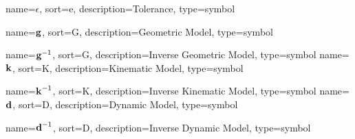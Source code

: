 	{%
		name={\ensuremath{\epsilon}},
		sort=e,
		description=Tolerance,
		type=symbol
	}
	\newcommand{\tol}{\gls{sym:tolerance}}

	{%
		name={\ensuremath{\vecfunc{g}}},
		sort=G,
		description=Geometric Model,
		type=symbol
	}
	\newcommand{\geometricmodel}{\gls{sym:geometricmodel}}

	{%
		name={\ensuremath{{\vecfunc{g}^{-1}}}},
		sort=G,
		description=Inverse Geometric Model,
		type=symbol
	}
	\newcommand{\invgeometricmodel}{\gls{sym:invgeometricmodel}}
	{%
		name={\ensuremath{\vecfunc{k}}},
		sort=K,
		description=Kinematic Model,
		type=symbol
	}
	\newcommand{\kinematicmodel}{\gls{sym:kinematicmodel}}

	{%
		name={\ensuremath{{\vecfunc{k}^{-1}}}},
		sort=K,
		description=Inverse Kinematic Model,
		type=symbol
	}
	\newcommand{\invkinematicmodel}{\gls{sym:invkinematicmodel}}
	{%
		name={\ensuremath{\vecfunc{d}}},
		sort=D,
		description=Dynamic Model,
		type=symbol
	}
	\newcommand{\dynamicmodel}{\gls{sym:dynamicmodel}}

	{%
		name={\ensuremath{{\vecfunc{d}^{-1}}}},
		sort=D,
		description=Inverse Dynamic Model,
		type=symbol
	}
	\newcommand{\invdynamicmodel}{\gls{sym:invdynamicmodel}}

